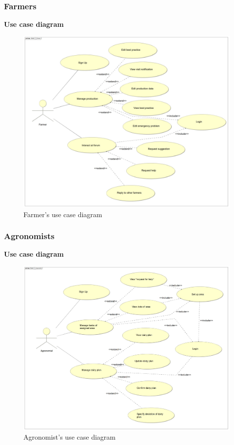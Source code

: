 \subsubsection{Farmers}
\textbf{\textcolor{myblue}{Use case diagram}}
\begin{figure}[H]
	\centering
    \includegraphics[page=1, width=\textwidth]{Images/ud_fa.JPG}

	\caption{\label{fig:f_use_case_diagram}Farmer's use case diagram}

\end{figure}
\label{sect:farmer_requirements}


\subsubsection{Agronomists}
\textbf{\textcolor{myblue}{Use case diagram}}
\begin{figure}[H]
	\centering
    \includegraphics[page=1, width=\textwidth]{Images/ud_ag.JPG}

	\caption{\label{fig:a_use_case_diagram}Agronomist's use case diagram}

\end{figure}
\label{sect:agronomist_requirements}


